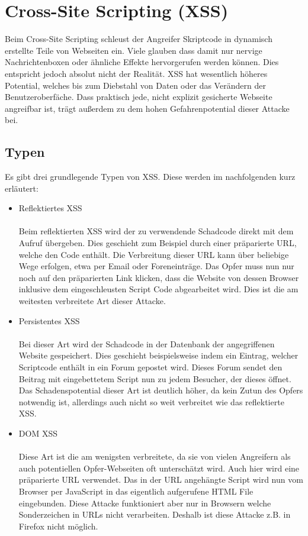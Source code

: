 \section{Cross-Site Scripting (XSS)}
Beim Cross-Site Scripting schleust der Angreifer Skriptcode in dynamisch erstellte Teile von Webseiten ein. Viele glauben dass damit nur nervige Nachrichtenboxen oder \"ahnliche Effekte hervorgerufen werden k\"onnen. Dies entspricht jedoch absolut nicht der Realit\"at. XSS hat wesentlich h\"oheres Potential, welches bis zum Diebstahl von Daten oder das Ver\"andern der Benutzeroberf\"ache. Dass praktisch jede, nicht explizit gesicherte Webseite angreifbar ist, tr\"agt au{\ss}erdem zu dem hohen Gefahrenpotential dieser Attacke bei.\cite{xssBuch}

\subsection{Typen}
Es gibt drei grundlegende Typen von XSS. Diese werden im nachfolgenden kurz erl\"autert:

\begin{itemize}
\item Reflektiertes XSS\\\\
Beim reflektierten XSS wird der zu verwendende Schadcode direkt mit dem Aufruf \"ubergeben. Dies geschieht zum Beispiel durch einer pr\"aparierte URL, welche den Code enth\"alt. Die Verbreitung dieser URL kann \"uber beliebige Wege erfolgen, etwa per Email oder Foreneintr\"age. Das Opfer muss nun nur noch auf den pr\"aparierten Link klicken, dass die Website von dessen Browser inklusive dem eingeschleusten Script Code abgearbeitet wird. Dies ist die am weitesten verbreitete Art dieser Attacke.\\
\item Persistentes XSS\\\\
Bei dieser Art wird der Schadcode in der Datenbank der angegriffenen Website gespeichert. Dies geschieht beispielsweise indem ein Eintrag, welcher Scriptcode enth\"alt in ein Forum gepostet wird. Dieses Forum sendet den Beitrag mit eingebettetem Script nun zu jedem Besucher, der dieses \"offnet. Das Schadenspotential dieser Art ist deutlich h\"oher, da kein Zutun des Opfers notwendig ist, allerdings auch nicht so weit verbreitet wie das reflektierte XSS.\\
\item DOM XSS\\\\
Diese Art ist die am wenigsten verbreitete, da sie von vielen Angreifern als auch potentiellen Opfer-Webseiten oft untersch\"atzt wird. Auch hier wird eine pr\"aparierte URL verwendet. Das in der URL angeh\"angte Script wird nun vom Browser per JavaScript in das eigentlich aufgerufene HTML File eingebunden. Diese Attacke funktioniert aber nur in Browsern welche Sonderzeichen in URLs nicht verarbeiten. Deshalb ist diese Attacke z.B. in Firefox nicht m\"oglich.
\end{itemize}
\cite{xssBuch}

